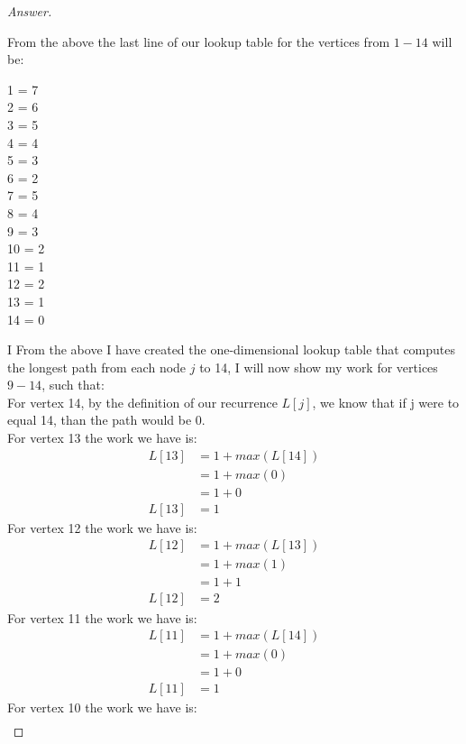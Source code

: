 \documentclass[11pt]{article}
\theoremstyle{definition}
\theoremstyle{definition}
\theoremstyle{definition}
\begin{document}
\begin{proof}[Answer]
\begin{center}
{}
\end{center}
From the above the last line of our lookup table for the vertices from $1-14$ will be: \\
\begin{center}
1 = 7 \\
2 = 6 \\
3 = 5 \\
4 = 4 \\
5 = 3 \\
6 = 2 \\
7 = 5 \\
8 = 4 \\
9 = 3 \\
10 = 2 \\
11 = 1 \\
12 = 2 \\
13 = 1 \\
14 = 0 \\
\end{center}
I
From the above I have created the one-dimensional lookup table that computes the longest path from each node $j$ to 14, I will now show my work for vertices $9 - 14$, such that: \\
For vertex 14, by the definition of our recurrence $L[j]$, we know that if j were to equal 14, than the path would be 0. \\
For vertex 13 the work we have is: \\
\begin{align*}
L[13] &= 1 + max(L[14]) \\
&= 1 + max(0) \\
&= 1 + 0 \\
L[13] &= 1
\end{align*}
For vertex 12 the work we have is: \\
\begin{align*}
L[12] &= 1 + max(L[13]) \\
&= 1 + max(1) \\
&= 1 + 1 \\
L[12] &= 2
\end{align*}
For vertex 11 the work we have is: \\
\begin{align*}
L[11] &= 1 + max(L[14]) \\
&= 1 + max(0) \\
&= 1 + 0 \\
L[11] &= 1
\end{align*}
For vertex 10 the work we have is: \\
\begin{align*}

\end{align*}
\end{proof}
\end{document}
